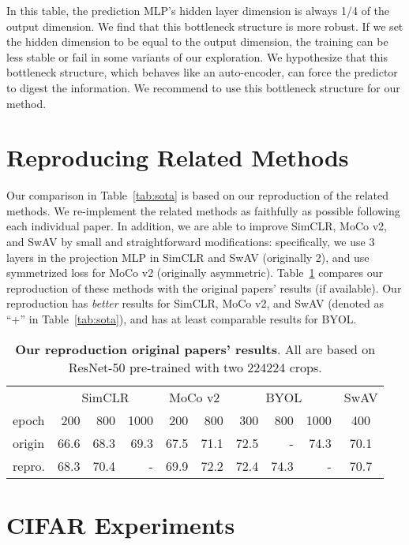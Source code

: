 \documentclass[final]{cvpr}
\newcommand{\tablestyle}[2]{\setlength{\tabcolsep}{#1}\renewcommand{\arraystretch}{#2}\centering\footnotesize}
\begin{document}
In this table, the prediction MLP's hidden layer dimension is always 1/4 of the output dimension. We find that this bottleneck structure is more robust. If we set the hidden dimension to be equal to the output dimension, the training can be less stable or fail in some variants of our exploration.
We hypothesize that this bottleneck structure, which behaves like an auto-encoder, can force the predictor to digest the information.
We recommend to use this bottleneck structure for our method.

\section{Reproducing Related Methods}

Our comparison in Table~\ref{tab:sota} is based on our reproduction of the related methods. We re-implement the related methods as faithfully as possible following each individual paper. In addition, we are able to improve SimCLR, MoCo v2, and SwAV by small and straightforward modifications: specifically, we use 3 layers in the projection MLP in SimCLR and SwAV (\vs originally 2), and use symmetrized loss for MoCo v2 (\vs originally asymmetric). Table~\ref{tab:repro} compares our reproduction of these methods with the original papers' results (if available). Our reproduction has \emph{better} results for SimCLR, MoCo v2, and SwAV (denoted as ``+'' in Table~\ref{tab:sota}), and has at least comparable results for BYOL.

\begin{table}[t]
\centering
\small
\tablestyle{4pt}{1.1}
\begin{tabular}{l | rrr | rr | rrr | c }
& \multicolumn{3}{c|}{SimCLR}
& \multicolumn{2}{c|}{MoCo v2}
& \multicolumn{3}{c|}{BYOL}
& \multicolumn{1}{c}{SwAV}
\\
epoch
& 200 & 800 & 1000  & 200 & 800  & 300 & 800 & 1000  & 400  \\
\shline
origin
& 66.6 & 68.3 & 69.3  & 67.5 & 71.1  & 72.5 & - & 74.3  & 70.1   \\
repro.
& 68.3 & 70.4 & -  & 69.9 & 72.2  & 72.4 & 74.3 & -  & 70.7   \end{tabular}
\vspace{.3em}
\caption{
\textbf{Our reproduction \vs original papers' results}. All are based on ResNet-50 pre-trained with two 224224 crops.
\label{tab:repro}
\vspace{-.5em}
}
\end{table}


\section{CIFAR Experiments}
\end{document}
